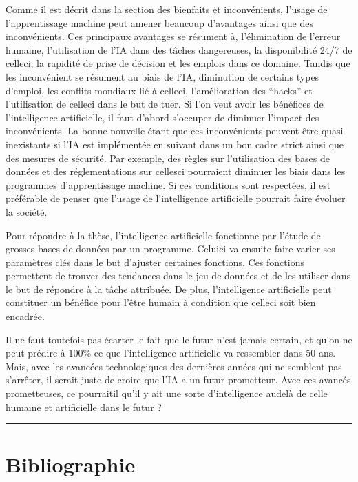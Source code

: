 \documentclass[letterpaper,10pt,french]{sphinxmanual}
\begin{document}
Comme il est décrit dans la section des bienfaits et inconvénients, l’usage
de l’apprentissage machine peut amener beaucoup d’avantages ainsi que des
inconvénients. Ces principaux avantages se résument à,
l’élimination de l’erreur humaine, l’utilisation de l’IA dans des tâches
dangereuses, la disponibilité 24/7 de celle\sphinxhyphen{}ci, la rapidité de prise de
décision et les emplois dans ce domaine. Tandis que les inconvénient se
résument au biais de l’IA, diminution de certains types d’emploi, les conflits
mondiaux lié à celle\sphinxhyphen{}ci, l’amélioration des “hacks” et l’utilisation de
celle\sphinxhyphen{}ci dans le but de tuer. Si l’on veut avoir les bénéfices de l’intelligence
artificielle, il faut d’abord s’occuper de diminuer l’impact des inconvénients.
La bonne nouvelle étant que ces inconvénients peuvent être quasi inexistants
si l’IA est implémentée en suivant dans un bon cadre strict ainsi que des
mesures de sécurité. Par exemple, des règles sur l’utilisation des bases
de données et des réglementations sur celles\sphinxhyphen{}ci pourraient diminuer les
biais dans les programmes d’apprentissage machine. Si ces conditions sont
respectées, il est préférable de penser que l’usage de l’intelligence
artificielle pourrait faire évoluer la société.

Pour répondre à la thèse, l’intelligence artificielle fonctionne par l’étude
de grosses bases de données par un programme. Celui\sphinxhyphen{}ci va ensuite faire
varier ses paramètres clés dans le but d’ajuster certaines fonctions. Ces
fonctions permettent de trouver des tendances dans le jeu de données et de
les utiliser dans le but de répondre à la tâche attribuée. De plus,
l’intelligence artificielle peut constituer un bénéfice pour l’être humain
à condition que celle\sphinxhyphen{}ci soit bien encadrée.

Il ne faut toutefois pas écarter le fait que le futur n’est jamais certain,
et qu’on ne peut prédire à 100\% ce que l’intelligence artificielle va
ressembler dans 50 ans. Mais, avec les avancées technologiques des dernières
années qui ne semblent pas s’arrêter, il serait juste de croire que l’IA
a un futur prometteur. Avec ces avancés prometteuses, ce pourrait\sphinxhyphen{}il qu’il
y ait une sorte d’intelligence au\sphinxhyphen{}delà de celle humaine et artificielle dans le futur ?


\bigskip\hrule\bigskip



\section{Bibliographie}
\label{\detokenize{zbib:bibliographie}}\label{\detokenize{zbib::doc}}
\end{document}
